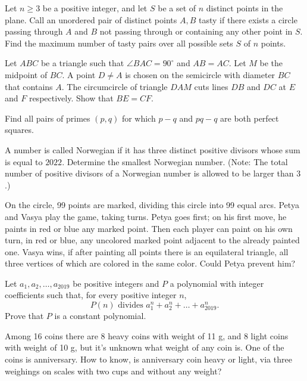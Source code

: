 \documentclass[11pt]{scrartcl}
\begin{document}
\begin{problem}[402288800658108]
Let $n \ge 3$ be a positive integer, and let $S$ be a set of $n$ distinct points in the plane. Call an unordered pair of distinct points ${A,B}$ tasty if there exists a circle passing through $A$ and $B$ not passing through or containing any other point in $S$. Find the maximum number of tasty pairs over all possible sets $S$ of $n$ points.
\end{problem}
\begin{problem}[6489054720541585180]
Let $ABC$ be a triangle such that $\angle BAC = 90^{\circ}$ and $AB = AC$. Let $M$ be the midpoint of $BC$. A point $D \neq A$ is chosen on the semicircle with diameter $BC$ that contains $A$. The circumcircle of triangle $DAM$ cuts lines $DB$ and $DC$ at $E$ and $F$ respectively. Show that $BE = CF$.
\end{problem}
\begin{problem}[2302470517258475835]
	Find all pairs of primes $(p, q)$ for which $p-q$ and $pq-q$ are both perfect squares.
\end{problem}
\begin{problem}[660403976209529]
A number is called Norwegian if it has three distinct positive divisors whose sum is equal to $2022$. Determine the smallest Norwegian number.
(Note: The total number of positive divisors of a Norwegian number is allowed to be larger than $3$.)
\end{problem}
\begin{problem}[2117883853443241027]
On the circle, 99 points are marked, dividing this circle into 99 equal arcs. Petya and Vasya play the game, taking turns. Petya goes first; on his first move, he paints in red or blue any marked point. Then each player can paint on his own turn, in red or blue, any uncolored marked point adjacent to the already painted one. Vasya wins, if after painting all points there is an equilateral triangle, all three vertices of which are colored in the same color. Could Petya prevent him?
\end{problem}
\begin{problem}[247248446755838]
	Let $a_1, a_2, \dots, a_{2019}$ be positive integers and $P$ a polynomial with integer coefficients such that, for every positive integer $n$,
$$P(n) \text{ divides  } a_1^n+a_2^n+\dots+a_{2019}^n.$$Prove that $P$ is a constant polynomial.
\end{problem}
\begin{problem}[709461884323637120]
Among 16 coins there are 8 heavy coins with weight of 11 g, and 8 light coins with weight of 10 g, but it's unknown what weight of any coin is. One of the coins is anniversary. How to know, is anniversary coin heavy or light, via three weighings on scales with two cups and without any weight?
\end{problem}
\end{document}
